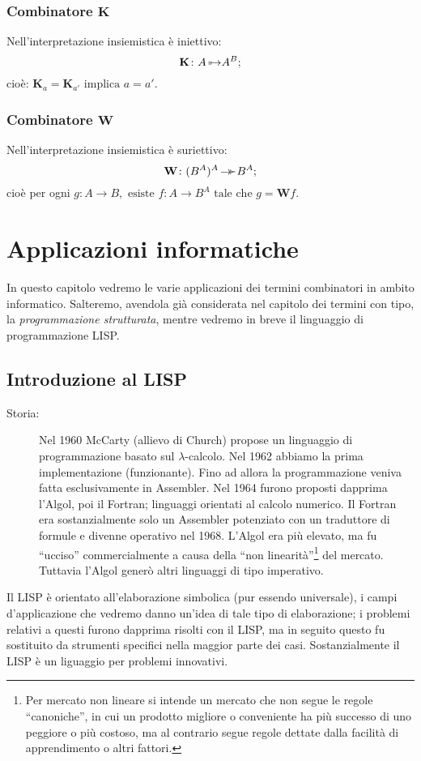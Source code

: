 \documentclass{book}
\newcommand*{\KK}{$\mathbf{K}$}    %
\newcommand*{\WW}{$\mathbf{W}$}    %
\newcommand*{\kk}{\mathbf{K}}    %
\newcommand*{\ww}{\mathbf{W}}    %
\newcommand*{\lbc}{$\lambda$-cal\-co\-lo}
\def\ddp{\hbox{\kern-.5em\lower.63ex\hbox{${}^\succ$}}}
\def\surjection{\mbox{$\to\ddp$}}
\def\injection{\mbox{$\mapstochar\,\mapsto$}}
\begin{document}
\subsection{Combinatore \KK}
Nell'interpretazione insiemistica \`e iniettivo:
\[
\kk \colon A\, \injection A^B;
\]
cio\`e: $\kk_a = \kk_{a'} \text{ implica } a = a'$.

\subsection{Combinatore \WW}
Nell'interpretazione insiemistica \`e suriettivo:
\[
\ww \colon (B^A)^A\, \surjection B^A;
\]
cio\`e per ogni $g \colon A \to B, \text{ esiste }
f \colon A \to B^A \text{ tale che } g = \ww f$.

\chapter{Applicazioni informatiche}
In questo capitolo vedremo le varie applicazioni dei termini combinatori in 
ambito informatico. Salteremo, avendola gi\`a considerata nel capitolo dei
termini con tipo, la \emph{programmazione strutturata}, mentre vedremo in breve
il linguaggio di programmazione LISP.

\section{Introduzione al LISP}
\begin{description}
\item[Storia:]
Nel 1960 McCarty (allievo di Church) propose un linguaggio di programmazione
basato sul \lbc. Nel 1962 abbiamo la prima implementazione (funzionante).
Fino ad allora la programmazione veniva fatta esclusivamente in Assembler.
Nel 1964 furono proposti dapprima l'Algol, poi il Fortran; linguaggi orientati 
al calcolo numerico. Il Fortran era sostanzialmente solo un Assembler 
potenziato con un traduttore di formule e divenne operativo nel 1968. L'Algol
era pi\`u elevato, ma fu ``ucciso'' commercialmente a causa della ``non 
linearit\`a''\footnote{Per mercato non lineare si intende un mercato che non 
segue le regole ``canoniche'', in cui un prodotto migliore o conveniente ha 
pi\`u successo di uno peggiore o pi\`u costoso, ma al contrario segue regole
dettate dalla facilit\`a di apprendimento o altri fattori.} del mercato. 
Tuttavia l'Algol gener\`o altri linguaggi di tipo imperativo.
\end{description}
Il LISP \`e orientato all'elaborazione simbolica (pur essendo universale), i
campi d'applicazione che vedremo danno un'idea di tale tipo di elaborazione;
i problemi relativi a questi furono dapprima risolti con il LISP, ma in seguito
questo fu sostituito da strumenti specifici nella maggior parte dei casi.
Sostanzialmente il LISP \`e un liguaggio per problemi innovativi.
\end{document}
